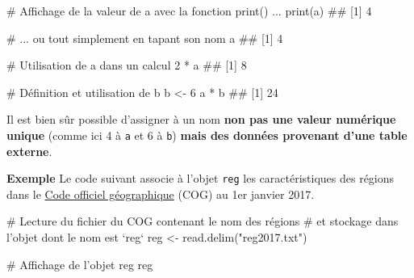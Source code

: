 \documentclass[12pt,twosided, notitlepage]{book}
\newenvironment{Shaded}{}{}
\newcommand{\KeywordTok}[1]{\textcolor[rgb]{0.00,0.00,1.00}{{#1}}}
\newcommand{\DecValTok}[1]{{#1}}
\newcommand{\StringTok}[1]{\textcolor[rgb]{0.00,0.50,0.50}{{#1}}}
\newcommand{\CommentTok}[1]{\textcolor[rgb]{0.00,0.50,0.00}{{#1}}}
\newcommand{\NormalTok}[1]{{#1}}
\renewenvironment{Shaded}{\begin{snugshade}}{\end{snugshade}}
\begin{document}
\begin{Shaded}
\begin{Highlighting}[]
\CommentTok{# Affichage de la valeur de a avec la fonction print() ...}
\KeywordTok{print}\NormalTok{(a)}
  \NormalTok{## [1] 4}

\CommentTok{# ... ou tout simplement en tapant son nom}
\NormalTok{a}
  \NormalTok{## [1] 4}

\CommentTok{# Utilisation de a dans un calcul}
\DecValTok{2} \NormalTok{*}\StringTok{ }\NormalTok{a}
  \NormalTok{## [1] 8}

\CommentTok{# Définition et utilisation de b}
\NormalTok{b <-}\StringTok{ }\DecValTok{6}
\NormalTok{a *}\StringTok{ }\NormalTok{b}
  \NormalTok{## [1] 24}
\end{Highlighting}
\end{Shaded}

Il est bien sûr possible d'assigner à un nom \textbf{non pas une valeur
numérique unique} (comme ici 4 à \texttt{a} et 6 à \texttt{b})
\textbf{mais des données provenant d'une table externe}.

\textbf{Exemple} Le code suivant associe à l'objet \texttt{reg} les
caractéristiques des régions dans le
\href{https://www.insee.fr/fr/information/2666684}{Code officiel
géographique} (COG) au 1er janvier 2017.


\begin{Shaded}
\begin{Highlighting}[]
\CommentTok{# Lecture du fichier du COG contenant le nom des régions}
\CommentTok{# et stockage dans l'objet dont le nom est `reg`}
\NormalTok{reg <-}\StringTok{ }\KeywordTok{read.delim}\NormalTok{(}\StringTok{"reg2017.txt"}\NormalTok{)}
\end{Highlighting}
\end{Shaded}

\begin{Shaded}
\begin{Highlighting}[]
\CommentTok{# Affichage de l'objet reg}
\NormalTok{reg}
\end{Highlighting}
\end{Shaded}
\end{document}
